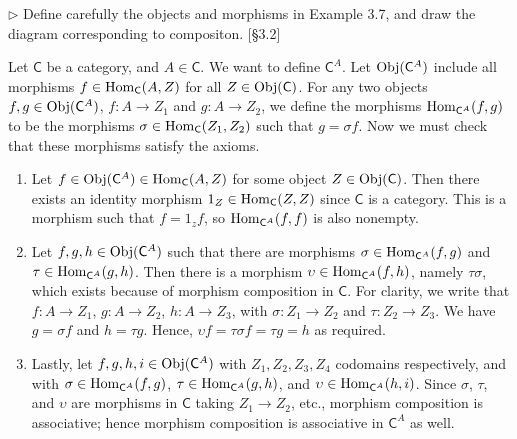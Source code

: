 \begin{problem}[3.7]
	$\rhd$ Define carefully the objects and morphisms in Example 3.7, and draw the
	diagram corresponding to compositon. [\S 3.2]
\end{problem}
\begin{solution}
	\def \C {\mathsf{C}}
	\def \CA {\mathsf{C}^A}
	
	Let $\mathsf{C}$ be a category, and $A\in\mathsf{C}$. We want to define ${\mathsf{C}^A}$. Let $\mathrm{Obj}({\mathsf{C}^A})$
	include all morphisms $f\in\mathrm{Hom}_\mathsf{C}(A,Z)$ for all $Z\in\mathrm{Obj}(\mathsf{C})$. For any two
	objects $f,g\in\mathrm{Obj}({\mathsf{C}^A})$, $f:A\to Z_1$ and $g:A\to Z_2$, we define the
	morphisms $\mathrm{Hom}_{\mathsf{C}^A}(f,g)$ to be the morphisms $\sigma\in\mathrm{Hom}_\mathsf{C}(Z_1, Z_2)$ such
	that $g=\sigma f$. Now we must check that these morphisms satisfy the axioms.
	
	\begin{enumerate}
		\item Let $f\in\mathrm{Obj}({\mathsf{C}^A})\in\mathrm{Hom}_\mathsf{C}(A,Z)$ for some object $Z\in\mathrm{Obj}(\mathsf{C})$. Then
		there exists an identity morphism $1_Z\in\mathrm{Hom}_\mathsf{C}(Z,Z)$ since $\mathsf{C}$ is a category.
		This is a morphism such that $f=1_zf$, so $\mathrm{Hom}_{\mathsf{C}^A}(f,f)$ is also nonempty.
		
		\item Let $f,g,h\in\mathrm{Obj}({\mathsf{C}^A})$ such that there are morphisms
		$\sigma\in\mathrm{Hom}_{\mathsf{C}^A}(f,g)$ and $\tau\in\mathrm{Hom}_{\mathsf{C}^A}(g,h)$. Then there is a morphism
		$\upsilon\in\mathrm{Hom}_{\mathsf{C}^A}(f,h)$, namely $\tau\sigma$, which exists because of
		morphism composition in $\mathsf{C}$. For clarity, we write that  $f:A\to Z_1$, $g:A\to
		Z_2$, $h:A\to Z_3$, with $\sigma:Z_1\to Z_2$ and $\tau:Z_2\to Z_3$. We have
		$g=\sigma f$ and $h=\tau g$. Hence, $\upsilon f = \tau\sigma f = \tau g = h$ as
		required.
		
		\item Lastly, let $f,g,h,i\in\mathrm{Obj}({\mathsf{C}^A})$ with $Z_1, Z_2, Z_3, Z_4$ codomains
		respectively, and with $\sigma\in\mathrm{Hom}_{\mathsf{C}^A}(f,g)$, $\tau\in\mathrm{Hom}_{\mathsf{C}^A}(g,h)$, and
		$\upsilon\in\mathrm{Hom}_{\mathsf{C}^A}(h,i)$. Since $\sigma$, $\tau$, and $\upsilon$ are morphisms
		in $\mathsf{C}$ taking $Z_1\to Z_2$, etc., morphism composition is associative; hence
		morphism composition is associative in ${\mathsf{C}^A}$ as well.
	\end{enumerate}
\end{solution}


